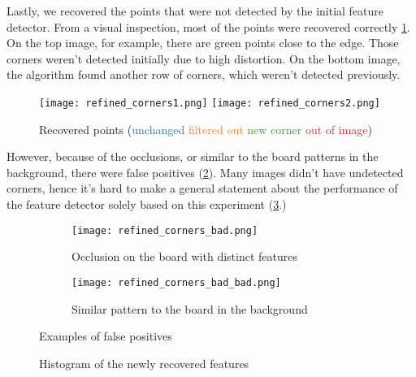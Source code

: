 Lastly, we recovered the points that were not detected by the initial feature
detector.
From a visual inspection, most of the points were recovered correctly
\cref{fig:recovered_good_points}.
On the top image, for example, there are green points close to the edge.
Those corners weren't detected initially due to high distortion. On the bottom
image, the algorithm found another row of corners, which weren't detected previously.

\begin{figure}[h]
	\centering
	\texttt{[image: refined\_corners1.png]}
	\texttt{[image: refined\_corners2.png]}

	\caption{Recovered points
		(\textcolor[HTML]{1f77b4}{unchanged}
		\textcolor[HTML]{ff7f0e}{filtered out}
		\textcolor[HTML]{2ca02c}{new corner}
		\textcolor[HTML]{d62728}{out of image})}
	\label{fig:recovered_good_points}
\end{figure}

\newpage
However,
because of the occlusions, or similar to the board patterns in the background,
there were false positives (\cref{fig:recovered_bad_points}). Many images didn't
have undetected corners, hence it's hard to make a general statement about the
performance of the feature detector solely based on this experiment
(\cref{fig:recovered_points_histogram}.)

\begin{figure}[h]
	\centering
	\begin{subfigure}[h]{0.6\linewidth}
		\texttt{[image: refined\_corners\_bad.png]}
		\caption{Occlusion on the board with distinct features}
	\end{subfigure}
	\begin{subfigure}[h]{0.6\linewidth}
		\texttt{[image: refined\_corners\_bad\_bad.png]}
		\caption{Similar pattern to the board in the background}
	\end{subfigure}
  \caption{Examples of false positives}
	\label{fig:recovered_bad_points}
\end{figure}

\begin{figure}[h!]
	\caption{Histogram of the newly recovered features}
	\label{fig:recovered_points_histogram}
\end{figure}


